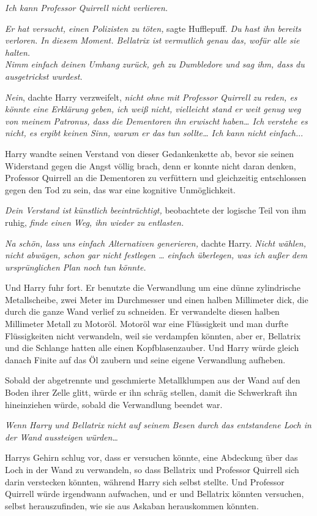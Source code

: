 {\emph{Ich kann Professor Quirrell nicht verlieren.}

\emph{Er hat versucht, einen Polizisten zu töten,} sagte Hufflepuff. \emph{Du hast ihn bereits verloren. In diesem Moment. Bellatrix ist vermutlich genau das, wofür alle sie halten.\\ Nimm einfach deinen Umhang zurück, geh zu Dumbledore und sag ihm, dass du ausgetrickst wurdest.}

\emph{Nein}, dachte Harry verzweifelt, \emph{nicht ohne mit Professor Quirrell zu reden, es könnte eine Erklärung geben, ich weiß nicht, vielleicht stand er weit genug weg von meinem Patronus, dass die Dementoren ihn erwischt haben… Ich verstehe es nicht, es ergibt keinen Sinn, warum er das tun sollte… Ich kann nicht einfach.}..

Harry wandte seinen Verstand von dieser Gedankenkette ab, bevor sie seinen Widerstand gegen die Angst völlig brach, denn er konnte nicht daran denken, Professor Quirrell an die Dementoren zu verfüttern und gleichzeitig entschlossen gegen den Tod zu sein, das war eine kognitive Unmöglichkeit.

\emph{Dein Verstand ist künstlich beeinträchtigt,} beobachtete der logische Teil von ihm ruhig, \emph{finde einen Weg, ihn wieder zu entlasten.}

\emph{Na schön, lass uns einfach Alternativen generieren,} dachte Harry. \emph{Nicht wählen, nicht abwägen, schon gar nicht festlegen … einfach überlegen, was ich außer dem ursprünglichen Plan noch tun könnte.}

Und Harry fuhr fort. Er benutzte die Verwandlung um eine dünne zylindrische Metallscheibe, zwei Meter im Durchmesser und einen halben Millimeter dick, die durch die ganze Wand verlief zu schneiden. Er verwandelte diesen halben Millimeter Metall zu Motoröl. Motoröl war eine Flüssigkeit und man durfte Flüssigkeiten nicht verwandeln, weil sie verdampfen könnten, aber er, Bellatrix und die Schlange hatten alle einen Kopfblasenzauber. Und Harry würde gleich danach Finite auf das Öl zaubern und seine eigene Verwandlung aufheben.

Sobald der abgetrennte und geschmierte Metallklumpen aus der Wand auf den Boden ihrer Zelle glitt, würde er ihn schräg stellen, damit die Schwerkraft ihn hineinziehen würde, sobald die Verwandlung beendet war.

\emph{Wenn Harry und Bellatrix nicht auf seinem Besen durch das entstandene Loch in der Wand aussteigen würden…}

Harrys Gehirn schlug vor, dass er versuchen könnte, eine Abdeckung über das Loch in der Wand zu verwandeln, so dass Bellatrix und Professor Quirrell sich darin verstecken könnten, während Harry sich selbst stellte. Und Professor Quirrell würde irgendwann aufwachen, und er und Bellatrix könnten versuchen, selbst herauszufinden, wie sie aus Askaban herauskommen könnten.

}
